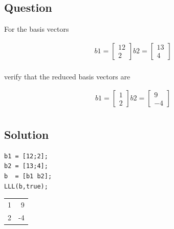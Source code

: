 \documentclass[11pt,a4paper,final]{article}
\begin{document}
\subsection{Question}
\label{sec:org0f5a3b6}
For the basis vectors

\begin{equation}
\begin{array}{cc}
b1 =
\begin{bmatrix}
12 \\ 2
\end{bmatrix}
b2 =
\begin{bmatrix}
13 \\ 4
\end{bmatrix} \\
\end{array}
\end{equation}

verify that the reduced basis vectors are

\begin{equation}
\begin{array}{cc}
b1 =
\begin{bmatrix}
1 \\ 2
\end{bmatrix}
b2 =
\begin{bmatrix}
9 \\ -4
\end{bmatrix} \\
\end{array}
\end{equation}

\subsection{Solution}
\label{sec:orge296260}

\begin{verbatim}
b1 = [12;2];
b2 = [13;4];
b  = [b1 b2];
LLL(b,true);
\end{verbatim}

\begin{center}
\begin{tabular}{rr}
1 & 9\\
2 & -4\\
\end{tabular}
\end{center}
\end{document}
